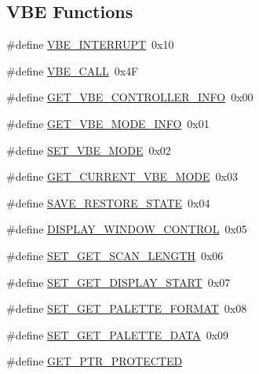 \subsection*{V\+BE Functions}
\begin{DoxyCompactItemize}
\item 
\#define \hyperlink{group__vbe_ga13e1037464e7407d1df6aa4041b180cd}{V\+B\+E\+\_\+\+I\+N\+T\+E\+R\+R\+U\+PT}~0x10
\item 
\#define \hyperlink{group__vbe_gaaa7fbe1e02a424af8eb9efc320d936c0}{V\+B\+E\+\_\+\+C\+A\+LL}~0x4F
\item 
\#define \hyperlink{group__vbe_gacbb1e5e9b91d58f76eb6c0554f03fc8c}{G\+E\+T\+\_\+\+V\+B\+E\+\_\+\+C\+O\+N\+T\+R\+O\+L\+L\+E\+R\+\_\+\+I\+N\+FO}~0x00
\item 
\#define \hyperlink{group__vbe_gac3faf02beab492e13687e9f10efb6ca4}{G\+E\+T\+\_\+\+V\+B\+E\+\_\+\+M\+O\+D\+E\+\_\+\+I\+N\+FO}~0x01
\item 
\#define \hyperlink{group__vbe_gab32156e1d72cb92b120bb16883c87eea}{S\+E\+T\+\_\+\+V\+B\+E\+\_\+\+M\+O\+DE}~0x02
\item 
\#define \hyperlink{group__vbe_ga64d38e10ac1b86615156b96e82b82ebc}{G\+E\+T\+\_\+\+C\+U\+R\+R\+E\+N\+T\+\_\+\+V\+B\+E\+\_\+\+M\+O\+DE}~0x03
\item 
\#define \hyperlink{group__vbe_ga87cd9f2b19724f7bef3327973717eee4}{S\+A\+V\+E\+\_\+\+R\+E\+S\+T\+O\+R\+E\+\_\+\+S\+T\+A\+TE}~0x04
\item 
\#define \hyperlink{group__vbe_gaaa8c204b50ef83c6d2819bf00a254c84}{D\+I\+S\+P\+L\+A\+Y\+\_\+\+W\+I\+N\+D\+O\+W\+\_\+\+C\+O\+N\+T\+R\+OL}~0x05
\item 
\#define \hyperlink{group__vbe_ga4db24dade600a2ae03a6c85121f932eb}{S\+E\+T\+\_\+\+G\+E\+T\+\_\+\+S\+C\+A\+N\+\_\+\+L\+E\+N\+G\+TH}~0x06
\item 
\#define \hyperlink{group__vbe_ga08e732a570bdadf08bac384db646be8a}{S\+E\+T\+\_\+\+G\+E\+T\+\_\+\+D\+I\+S\+P\+L\+A\+Y\+\_\+\+S\+T\+A\+RT}~0x07
\item 
\#define \hyperlink{group__vbe_gaef71e0667c3e5dbc58fa9b150b8a077a}{S\+E\+T\+\_\+\+G\+E\+T\+\_\+\+P\+A\+L\+E\+T\+T\+E\+\_\+\+F\+O\+R\+M\+AT}~0x08
\item 
\#define \hyperlink{group__vbe_ga7fd3951844513e578e8a93ca8ef7b39d}{S\+E\+T\+\_\+\+G\+E\+T\+\_\+\+P\+A\+L\+E\+T\+T\+E\+\_\+\+D\+A\+TA}~0x09
\item 
\#define \hyperlink{group__vbe_ga78c6b278f083525b36116e11a86e05b3}{G\+E\+T\+\_\+\+P\+T\+R\+\_\+\+P\+R\+O\+T\+E\+C\+T\+ED}
\end{DoxyCompactItemize}


